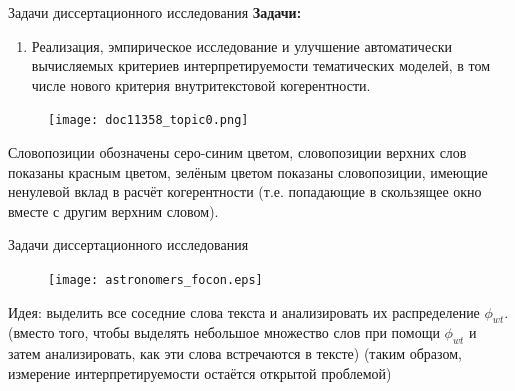 \begin{frame}[t]{Задачи диссертационного исследования}
\small
\textbf{Задачи:}
\begin{enumerate}
    \item Реализация, эмпирическое исследование и улучшение автоматически вычисляемых критериев интерпретируемости тематических моделей, в том числе нового критерия внутритекстовой когерентности.
\end{enumerate}

\begin{figure}
        \texttt{[image: doc11358\_topic0.png]} %
\end{figure}
\vspace{-7pt}
Словопозиции обозначены серо-синим цветом, словопозиции верхних слов показаны красным цветом, зелёным цветом показаны словопозиции, имеющие ненулевой вклад в расчёт когерентности (т.е. попадающие в скользящее окно вместе с другим верхним словом).
\normalsize

\end{frame}
\begin{frame}[t]{Задачи диссертационного исследования}
\begin{figure}
   \centering
    \texttt{[image: astronomers\_focon.eps]} %
\end{figure}

Идея: выделить все соседние слова текста и анализировать их распределение $\phi_{wt}$.\\
\medskip
(вместо того, чтобы выделять небольшое множество слов при помощи $\phi_{wt}$ и затем анализировать, как эти слова встречаются в тексте)
\bigskip
\small{(таким образом, измерение интерпретируемости остаётся открытой проблемой)}
\end{frame}


